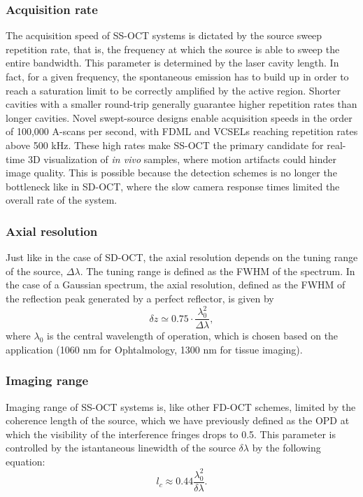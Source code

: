 \subsubsection{Acquisition rate}

The acquisition speed of \ac{SS-OCT} systems is dictated by the source sweep repetition rate, that is, the frequency at which the source is able to sweep the entire bandwidth. This parameter is determined by the laser cavity length. In fact, for a given frequency, the spontaneous emission has to build up in order to reach a saturation limit to be correctly amplified by the active region. Shorter cavities with a smaller round-trip generally guarantee higher repetition rates than longer cavities. Novel swept-source designs enable acquisition speeds in the order of 100,000 A-scans per second, with \ac{FDML} and \acp{VCSEL} reaching repetition rates above 500 kHz. These high rates make \ac{SS-OCT} the primary candidate for real-time 3D visualization of \emph{in vivo} samples, where motion artifacts could hinder image quality. This is possible because the detection schemes is no longer the bottleneck like in \ac{SD-OCT}, where the slow camera response times limited the overall rate of the system. 

\subsubsection{Axial resolution}
Just like in the case of \ac{SD-OCT}, the axial resolution depends on the tuning range of the source, $\Delta \lambda$. The tuning range is defined as the \ac{FWHM} of the spectrum. In the case of a Gaussian spectrum, the axial resolution, defined as the \ac{FWHM} of the reflection peak generated by a perfect reflector, is given by
\begin{equation}\label{eq:ss-axial-resolution}
	\delta z \simeq 0.75 \cdot \frac{\lambda_0^2}{\Delta \lambda},
\end{equation}
where $\lambda_0$ is the central wavelength of operation, which is chosen based on the application (1060 nm for Ophtalmology, 1300 nm for tissue imaging). 

\subsubsection{Imaging range}
Imaging range of \ac{SS-OCT} systems is, like other \ac{FD-OCT} schemes, limited by the coherence length of the source, which we have previously defined as the \ac{OPD} at which the visibility of the interference fringes drops to 0.5. This parameter is controlled by the istantaneous linewidth of the source $\delta \lambda$ by the following equation:
\begin{equation}
	l_c \approx 0.44 \frac{\lambda_0^2}{\delta \lambda}.
\end{equation}

